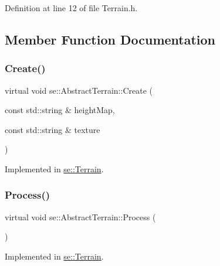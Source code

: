 Definition at line 12 of file Terrain.\+h.



\subsection{Member Function Documentation}
\mbox{\label{classse_1_1_abstract_terrain_ac8254489e68bcfc1960b968afeb683b0}} 
\subsubsection{\texorpdfstring{Create()}{Create()}}
{\footnotesize\ttfamily virtual void se\+::\+Abstract\+Terrain\+::\+Create (\begin{DoxyParamCaption}\item[{const std\+::string \&}]{height\+Map,  }\item[{const std\+::string \&}]{texture }\end{DoxyParamCaption})\hspace{0.3cm}{\ttfamily [pure virtual]}}



Implemented in \mbox{\hyperlink{classse_1_1_terrain_aa4faf6049af59a776a2464175e62ff08}{se\+::\+Terrain}}.

\mbox{\label{classse_1_1_abstract_terrain_af2f0249eead2b62a82baa2ecbb52efeb}} 
\subsubsection{\texorpdfstring{Process()}{Process()}}
{\footnotesize\ttfamily virtual void se\+::\+Abstract\+Terrain\+::\+Process (\begin{DoxyParamCaption}{ }\end{DoxyParamCaption})\hspace{0.3cm}{\ttfamily [pure virtual]}}



Implemented in \mbox{\hyperlink{classse_1_1_terrain_aa4eeb1886f46d2f33e1633b6f7c7345c}{se\+::\+Terrain}}.

\mbox{\label{classse_1_1_abstract_terrain_aeee5b6c81be6aee211819b8d79718bf5}} 
